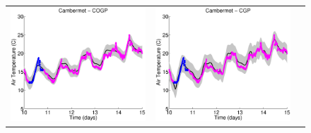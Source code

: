 \begin{figure}
\centering
\begin{tabular}{ccc}
\includegraphics[scale=0.3]{figures/cogp-weatherCambermet.eps} &
\includegraphics[scale=0.3]{figures/cgp-weatherCambermet.eps} &

\end{tabular}
\end{figure}
